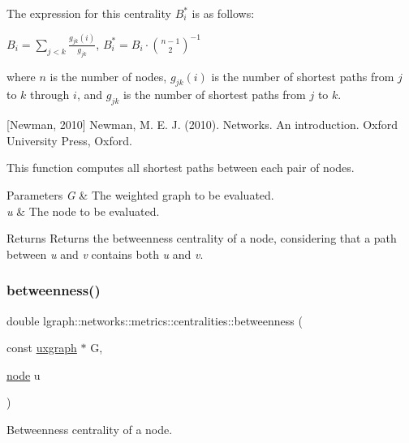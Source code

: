 The expression for this centrality $B_i^*$ is as follows\+:

$ B_i = \sum_{j < k} \frac{g_{jk}(i)}{g_{jk}} $, $B_i^* = B_i \cdot {n - 1 \choose 2}^{-1}$

where $n$ is the number of nodes, $g_{jk}(i)$ is the number of shortest paths from $j$ to $k$ through $i$, and $g_{jk}$ is the number of shortest paths from $j$ to $k$.

\mbox{[}Newman, 2010\mbox{]} Newman, M. E. J. (2010). Networks. An introduction. Oxford University Press, Oxford.

This function computes all shortest paths between each pair of nodes. 
\begin{DoxyParams}{Parameters}
{\em G} & The weighted graph to be evaluated. \\
\hline
{\em u} & The node to be evaluated. \\
\hline
\end{DoxyParams}
\begin{DoxyReturn}{Returns}
Returns the betweenness centrality of a node, considering that a path between {\itshape u} and {\itshape v} contains both {\itshape u} and {\itshape v}. 
\end{DoxyReturn}
\mbox{\label{namespacelgraph_1_1networks_1_1metrics_1_1centralities_a0834cb72864b1bdf574c212c5cafbce9}} 
\subsubsection{\texorpdfstring{betweenness()}{betweenness()}\hspace{0.1cm}{\footnotesize\ttfamily [2/8]}}
{\footnotesize\ttfamily double lgraph\+::networks\+::metrics\+::centralities\+::betweenness (\begin{DoxyParamCaption}\item[{const \hyperlink{classlgraph_1_1uxgraph}{uxgraph} $\ast$}]{G,  }\item[{\hyperlink{namespacelgraph_a397169dd66adf725210a30fb7251773e}{node}}]{u }\end{DoxyParamCaption})}



Betweenness centrality of a node. 

